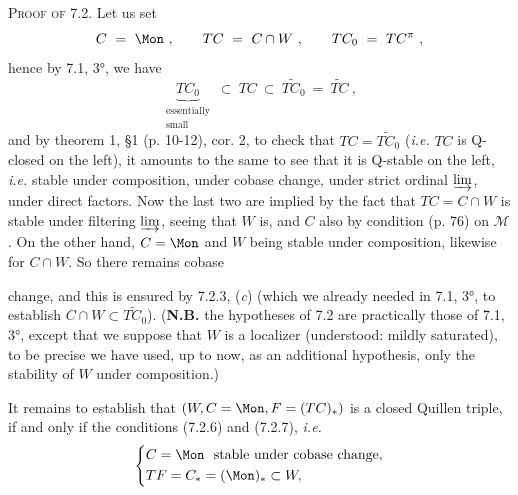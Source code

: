 \textsc{Proof of} 7.2. Let us set
\[
C \ = \ \Mon \ , \qquad TC \ = \ C \cap W \ , \qquad TC_0 \ = \ TC^{\pi} \ ,
\]
hence by 7.1, 3°, we have
\[
\underbrace{TC_0}_{\substack{\text{essentially}\\ \text{small}}} \ \subset \ TC \ \subset \ \widetilde{TC_0} \ = \ \widetilde{TC} \ ,
\]
and by theorem 1, §1 (p. 10-12), cor. 2, to check that $TC = \widetilde{TC_0}$ (\textit{i.e.} $TC$ is Q-closed on the left), it amounts to the same to see that it is Q-stable on the left, \textit{i.e.} stable under composition, under cobase change, under strict ordinal $\varinjlim$, under direct factors. Now the last two are implied by the fact that $TC = C \cap W$ is stable under filtering $\varinjlim$, seeing that $W$ is, and $C$ also by condition  (p. 76) on $\mathcal{M}$. On the other hand, $C = \Mon$ and $W$ being stable under composition, likewise for $C \cap W$. So there remains cobase


change, and this is ensured by 7.2.3, (\textit{c}) (which we already needed in 7.1, 3°, to establish $C \cap W \subset \widetilde{TC_0}$). (\textbf{N.B.} the hypotheses of 7.2 are practically those of 7.1, 3°, except that we suppose that $W$ is a localizer (understood: mildly saturated), to be precise we have used, up to now, as an additional hypothesis, only the stability of $W$ under composition.)

It remains to establish that $(W, C = \Mon, F = (TC)_*)$ is a closed Quillen triple, if and only if the conditions (7.2.6) and (7.2.7), \textit{i.e.}
\[
\left\{
\begin{aligned}
& C = \Mon \ \ \text{stable under cobase change,} \\
& TF = C_* = (\Mon)_* \subset W,
\end{aligned}
\right.
\]